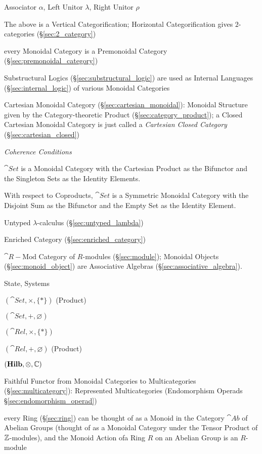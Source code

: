 Associator $\alpha$, Left Unitor $\lambda$, Right Unitor $\rho$

The above is a Vertical Categorification; Horizontal Categorification
gives $2$-categories (\S\ref{sec:2_category})

every Monoidal Category is a Premonoidal Category
(\S\ref{sec:premonoidal_category})

\fist Substructural Logics (\S\ref{sec:substructural_logic}) are used
as Internal Languages (\S\ref{sec:internal_logic}) of various Monoidal
Categories

\fist Cartesian Monoidal Category (\S\ref{sec:cartesian_monoidal}): Monoidal
Structure given by the Category-theoretic Product
(\S\ref{sec:category_product}); a Closed Cartesian Monoidal Category is just
called a \emph{Cartesian Closed Category} (\S\ref{sec:cartesian_closed})

\emph{Coherence Conditions}

$\cat{Set}$ is a Monoidal Category with the Cartesian Product as
the Bifunctor and the Singleton Sets as the Identity Elements.

With respect to Coproducts, $\cat{Set}$ is a Symmetric Monoidal
Category with the Disjoint Sum as the Bifunctor and the Empty
Set as the Identity Element.

Untyped $\lambda$-calculus (\S\ref{sec:untyped_lambda})

Enriched Category (\S\ref{sec:enriched_category})

$\cat{R-\text{Mod}}$ Category of $R$-modules (\S\ref{sec:module});
Monoidal Objects (\S\ref{sec:monoid_object}) are Associative Algebras
(\S\ref{sec:associative_algebra}).

State, Systems %

$(\cat{Set}, \times, \{*\})$ (Product)

$(\cat{Set}, +, \varnothing)$

$(\cat{Rel}, \times, \{*\})$

$(\cat{Rel}, +, \varnothing)$ (Product)

$(\mathbf{Hilb}, \otimes, \mathbb{C})$

Faithful Functor from Monoidal Categories to Multicategories
(\S\ref{sec:multicategory}): Represented Multicategories (Endomorphism
Operads \S\ref{sec:endomorphism_operad})

every Ring (\S\ref{sec:ring}) can be thought of as a Monoid in the Category
$\cat{Ab}$ of Abelian Groups (thought of as a Monoidal Category under the
Tensor Product of $\mathbb{Z}$-modules), and the Monoid Action ofa Ring $R$ on an
Abelian Group is an $R$-module



